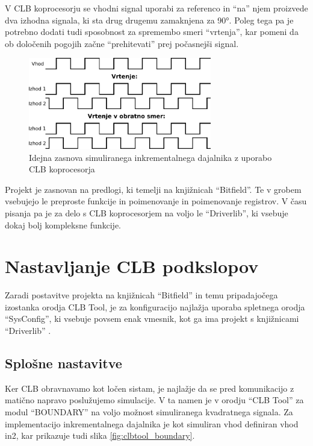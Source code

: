 \documentclass[a4paper]{article}
\begin{document}
\begin{sloppypar}
V CLB koprocesorju se vhodni signal uporabi za referenco in ``na'' njem
proizvede dva izhodna signala, ki sta drug drugemu zamaknjena za 90°. Poleg
tega pa je potrebno dodati tudi sposobnost za spremembo smeri ``vrtenja'', kar
pomeni da ob določenih pogojih začne ``prehitevati'' prej počasnejši signal.

\begin{figure}[htb]
    \centerline{\includegraphics[width=8cm]{enkoder_zasnova}}
    \caption{Idejna zasnova simuliranega inkrementalnega dajalnika z uporabo
             CLB koprocesorja}
    \label{fig:enkoder_zasnova} 
\end{figure} 

Projekt je zasnovan na predlogi, ki temelji na knjižnicah ``Bitfield''. Te v
grobem vsebujejo le preproste funkcije in poimenovanje in poimenovanje
registrov. V času pisanja pa je za delo s CLB koprocesorjem na voljo le
``Driverlib'', ki vsebuje dokaj bolj kompleksne funkcije.


\section{Nastavljanje CLB podkslopov}\label{sec:nastavitve_podsklopov}
Zaradi postavitve projekta na knjižnicah ``Bitfield'' in temu pripadajočega
izostanka orodja CLB Tool, je za konfiguracijo najlažja uporaba spletnega
orodja ``SysConfig'', ki vsebuje povsem enak vmesnik, kot ga ima projekt s
knjižnicami ``Driverlib'' \cite{sysconfig}.

\subsection{Splošne nastavitve}
Ker CLB obravnavamo kot ločen sistam, je najlažje da se pred komunikacijo z
matično napravo poslužujemo simulacije. V ta namen je v orodju ``CLB Tool'' za
modul ``BOUNDARY'' na voljo možnost simuliranega kvadratnega signala. Za
implementacijo inkrementalnega dajalnika je kot simuliran vhod definiran vhod
in2, kar prikazuje tudi slika \ref{fig:clbtool_boundary}.


\end{sloppypar}
\end{document}

